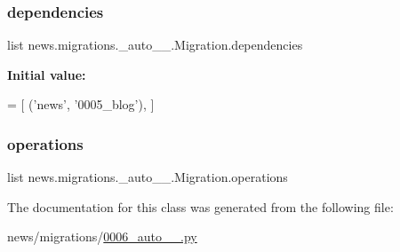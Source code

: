 \subsubsection{\texorpdfstring{dependencies}{dependencies}}
{\footnotesize\ttfamily list news.\+migrations.\+\_\+auto\+\_\+\_.\+Migration.\+dependencies\hspace{0.3cm}{\ttfamily [static]}}

{\bfseries Initial value\+:}
\begin{DoxyCode}
=  [
        (\textcolor{stringliteral}{'news'}, \textcolor{stringliteral}{'0005\_blog'}),
    ]
\end{DoxyCode}
\mbox{\label{classnews_1_1migrations_1_10006__auto__20181013__0120_1_1_migration_a6c786bba5496eef9adf188f58419b94e}} 
\subsubsection{\texorpdfstring{operations}{operations}}
{\footnotesize\ttfamily list news.\+migrations.\+\_\+auto\+\_\+\_.\+Migration.\+operations\hspace{0.3cm}{\ttfamily [static]}}



The documentation for this class was generated from the following file\+:\begin{DoxyCompactItemize}
\item 
news/migrations/\mbox{\hyperlink{0006__auto__20181013__0120_8py}{0006\+\_\+auto\+\_\+\_.\+py}}\end{DoxyCompactItemize}
